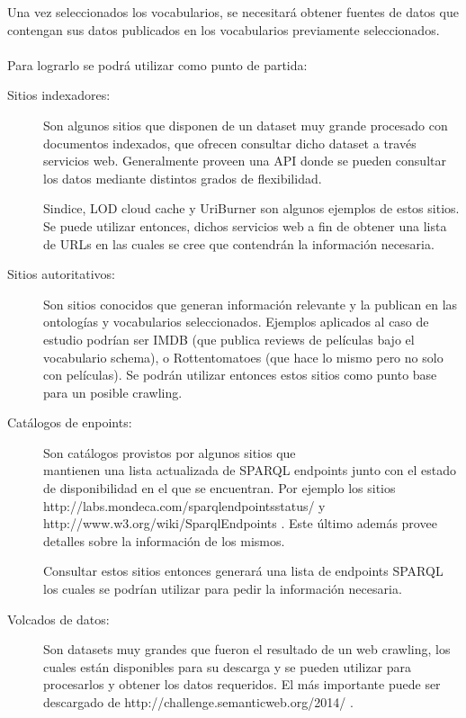 Una vez seleccionados los vocabularios, se necesitará obtener fuentes de datos que contengan sus datos publicados en los vocabularios previamente seleccionados.
 \\\\
Para lograrlo se podrá utilizar como punto de partida:
\begin{description}
\item[Sitios indexadores:] Son algunos sitios que disponen de un dataset muy grande procesado con documentos indexados, que ofrecen consultar dicho 
dataset a través servicios web. Generalmente proveen una API donde se pueden consultar los datos mediante distintos grados de flexibilidad.

Sindice, LOD cloud cache y UriBurner son algunos ejemplos de estos sitios. Se puede utilizar entonces, dichos servicios web a fin
de obtener una lista de URLs en las cuales se cree que contendrán la información necesaria.

\item[Sitios autoritativos:] Son sitios conocidos que generan información relevante y la publican en las ontologías y vocabularios 
seleccionados. Ejemplos aplicados al caso de estudio podrían ser IMDB (que publica reviews de películas bajo el vocabulario schema), o Rottentomatoes
(que hace lo mismo pero no solo con películas). Se podrán utilizar entonces estos sitios como punto base para un posible crawling.

\item[Catálogos de enpoints:] Son catálogos provistos por algunos sitios que \\\noindent mantienen una lista actualizada de SPARQL endpoints 
junto con el estado de disponibilidad en el que se encuentran. Por ejemplo los sitios \\\noindent http://labs.mondeca.com/sparqlendpointsstatus/ y 
\\\noindent http://www.w3.org/wiki/SparqlEndpoints . Este último además provee detalles sobre la información de los mismos.

Consultar estos sitios entonces generará una lista de endpoints SPARQL los cuales se podrían utilizar para pedir la información necesaria.

\item[Volcados de datos:] Son datasets muy grandes que fueron el resultado de un web crawling, los cuales están disponibles para su descarga 
y se pueden utilizar para procesarlos y obtener los datos requeridos. El más importante puede ser descargado de http://challenge.semanticweb.org/2014/ .
\end{description}
